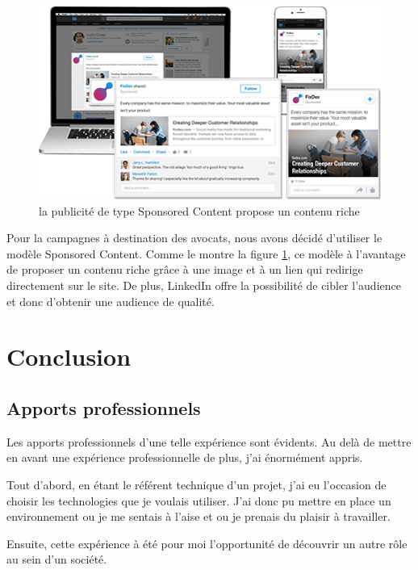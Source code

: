 \documentclass[]{report}
\begin{document}
      \begin{figure}
        \includegraphics[width=\linewidth]{img/linkedin_sponsored_content.png}
        \caption{la publicité de type Sponsored Content propose un contenu riche}
        \label{linkedin_sponsored_content}
      \end{figure}

      Pour la campagnes à destination des avocats, nous avons décidé d’utiliser le modèle Sponsored Content. Comme le montre la figure \ref{linkedin_sponsored_content}, ce modèle à l'avantage de proposer un contenu riche grâce à une image et à un lien qui redirige directement sur le site. De plus, LinkedIn offre la possibilité de cibler l'audience et donc d'obtenir une audience de qualité.


\chapter{Conclusion}

  \section{Apports professionnels}

    Les apports professionnels d'une telle expérience sont évidents. Au delà de mettre en avant une expérience professionnelle de plus, j'ai énormément appris.

    Tout d'abord, en étant le référent technique d'un projet, j'ai eu l'occasion de choisir les technologies que je voulais utiliser. J'ai donc pu mettre en place un environnement ou je me sentais à l'aise et ou je prenais du plaisir à travailler.

    Ensuite, cette expérience à été pour moi l'opportunité de découvrir un autre rôle au sein d'un société.
\end{document}
